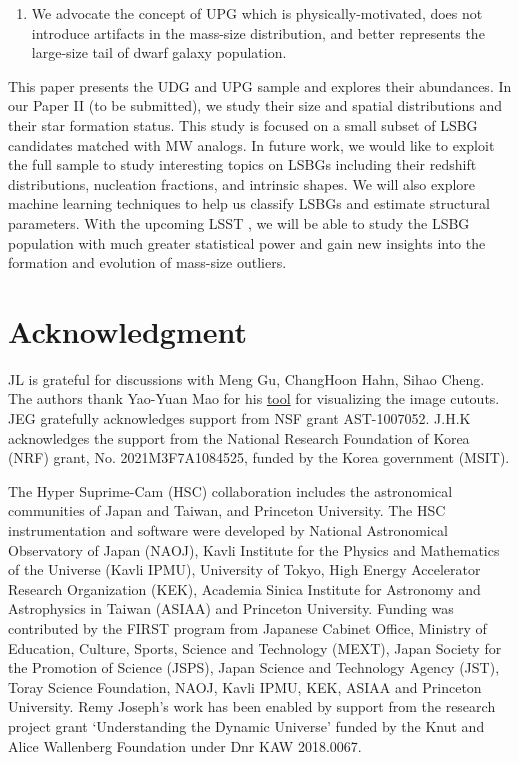 \documentclass[twocolumn,astrosymb,twocolappendix]{aastex631}
\begin{document}
\begin{CJK*}{UTF8}{gbsn}
\begin{enumerate}
    \item We advocate the concept of UPG which is physically-motivated, does not introduce artifacts in the mass-size distribution, and better represents the large-size tail of dwarf galaxy population. 
\end{enumerate}

This paper presents the UDG and UPG sample and explores their abundances. In our Paper II (to be submitted), we study their size and spatial distributions and their star formation status. This study is focused on a small subset of LSBG candidates matched with MW analogs. In future work, we would like to exploit the full sample to study interesting topics on LSBGs including their redshift distributions, nucleation fractions, and intrinsic shapes. We will also explore machine learning techniques to help us classify LSBGs and estimate structural parameters. With the upcoming LSST \citep{lsst2009,LSST2019}, we will be able to study the LSBG population with much greater statistical power and gain new insights into the formation and evolution of mass-size outliers. 

\section*{Acknowledgment}
JL is grateful for discussions with Meng Gu, ChangHoon Hahn, Sihao Cheng. The authors thank Yao-Yuan Mao for his \href{https://github.com/yymao/decals-image-list-tool}{tool} for visualizing the image cutouts. JEG gratefully acknowledges support from NSF grant AST-1007052. J.H.K acknowledges the support from the National Research Foundation of Korea (NRF) grant, No. 2021M3F7A1084525, funded by the Korea government (MSIT).

The Hyper Suprime-Cam (HSC) collaboration includes the astronomical communities of Japan and Taiwan, and Princeton University. The HSC instrumentation and software were developed by National Astronomical Observatory of Japan (NAOJ), Kavli Institute for the Physics and Mathematics of the Universe (Kavli IPMU), University of Tokyo, High Energy Accelerator Research Organization (KEK), Academia Sinica Institute for Astronomy and Astrophysics in Taiwan (ASIAA) and Princeton University.  
Funding was contributed by the FIRST program from Japanese Cabinet Office, Ministry of Education, Culture, Sports, Science and Technology (MEXT), Japan Society for the Promotion of Science (JSPS), Japan Science and Technology Agency (JST), Toray Science Foundation, NAOJ, Kavli IPMU, KEK, ASIAA and Princeton University. Remy Joseph's work has been enabled by support from the research project grant ‘Understanding the Dynamic Universe’ funded by the Knut and Alice Wallenberg Foundation under Dnr KAW 2018.0067.


\end{CJK*}
\end{document}
